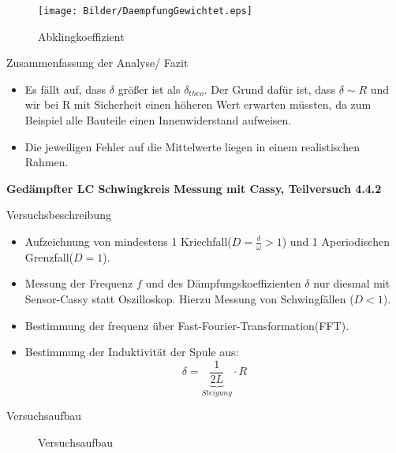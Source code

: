 \documentclass[11pt]{beamer}
\begin{document}
\begin{frame}
\begin{figure}[H]
\caption{Abklingkoeffizient}
\centering
\texttt{[image: Bilder/DaempfungGewichtet.eps]}
\end{figure}
\end{frame}

\begin{frame}{Zusammenfassung der Analyse/ Fazit}
\begin{itemize}

\item Es fällt auf, dass $\delta$ größer ist als $\delta_{theo}$. Der Grund dafür ist, dass $\delta \sim R$ und wir bei R mit Sicherheit einen höheren Wert erwarten müssten, da zum Beispiel alle Bauteile einen Innenwiderstand aufweisen. 
\newline
\item Die jeweiligen Fehler auf die Mittelwerte liegen in einem realistischen Rahmen.
\end{itemize}
\end{frame}

\begin{frame}
\textbf{Gedämpfter LC Schwingkreis Messung mit Cassy, Teilversuch 4.4.2}\centering
\end{frame}

\begin{frame}{Versuchsbeschreibung}
\begin{itemize}
\item Aufzeichnung von mindestens 1 Kriechfall($D=\frac{\delta}{\omega}>1$) und 1 Aperiodischen Grenzfall($D=1$).
\item Messung der Frequenz $f$ und des Dämpfungskoeffizienten $\delta$ nur diesmal mit Sensor-Cassy statt Oszilloskop. Hierzu Messung von Schwingfällen ($D<1$).
\item Bestimmung der frequenz über Fast-Fourier-Transformation(FFT).
\item Bestimmung der Induktivität der Spule aus:
\begin{equation}
\delta =\underbrace{\frac{1}{2L}}_{Steigung}\cdot R
\end{equation}
\end{itemize}
\end{frame}

\begin{frame}{Versuchsaufbau}
\begin{figure}[H]
\caption{Versuchsaufbau}
\end{figure}
\end{frame}
\end{document}
